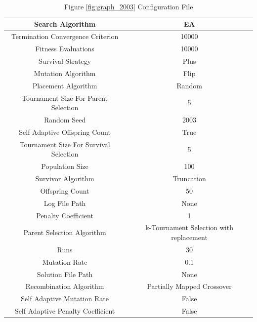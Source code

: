 \documentclass{standalone}
\begin{document}
\begin{table}[!htb]
	\centering
	\caption{Figure \ref{fig:graph_2003} Configuration File}
	\label{tab:graph_2003}
	\begin{tabular}{| c | c |}
		\hline
		Search Algorithm		& EA		 \\
		\hline
		Termination Convergence Criterion		& 10000		 \\
		\hline
		Fitness Evaluations		& 10000		 \\
		\hline
		Survival Strategy		& Plus		 \\
		\hline
		Mutation Algorithm		& Flip		 \\
		\hline
		Placement Algorithm		& Random		 \\
		\hline
		Tournament Size For Parent Selection		& 5		 \\
		\hline
		Random Seed		& 2003		 \\
		\hline
		Self Adaptive Offspring Count		& True		 \\
		\hline
		Tournament Size For Survival Selection		& 5		 \\
		\hline
		Population Size		& 100		 \\
		\hline
		Survivor Algorithm		& Truncation		 \\
		\hline
		Offspring Count		& 50		 \\
		\hline
		Log File Path		& None		 \\
		\hline
		Penalty Coefficient		& 1		 \\
		\hline
		Parent Selection Algorithm		& k-Tournament Selection with replacement		 \\
		\hline
		Runs		& 30		 \\
		\hline
		Mutation Rate		& 0.1		 \\
		\hline
		Solution File Path		& None		 \\
		\hline
		Recombination Algorithm		& Partially Mapped Crossover		 \\
		\hline
		Self Adaptive Mutation Rate		& False		 \\
		\hline
		Self Adaptive Penalty Coefficient		& False		 \\
		\hline
	\end{tabular}
\end{table}
\end{document}
